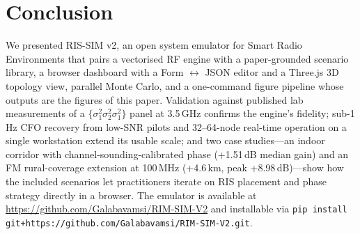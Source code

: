 \documentclass{article}
\begin{document}
\section{Conclusion}

We presented RIS-SIM v2, an open system emulator for Smart Radio Environments that pairs a vectorised RF engine with a paper-grounded scenario library, a browser dashboard with a Form $\leftrightarrow$ JSON editor and a Three.js 3D topology view, parallel Monte Carlo, and a one-command figure pipeline whose outputs are the figures of this paper. Validation against published lab measurements of a $\{\sigma_1^2\sigma_2^2\sigma_1^2\}$ panel at 3.5\,GHz confirms the engine's fidelity; sub-1\,Hz CFO recovery from low-SNR pilots and 32--64-node real-time operation on a single workstation extend its usable scale; and two case studies---an indoor corridor with channel-sounding-calibrated phase (+1.51\,dB median gain) and an FM rural-coverage extension at 100\,MHz (+4.6\,km, peak +8.98\,dB)---show how the included scenarios let practitioners iterate on RIS placement and phase strategy directly in a browser. The emulator is available at \url{https://github.com/Galabavamsi/RIM-SIM-V2} and installable via \texttt{pip install git+https://github.com/Galabavamsi/RIM-SIM-V2.git}.
\end{document}
